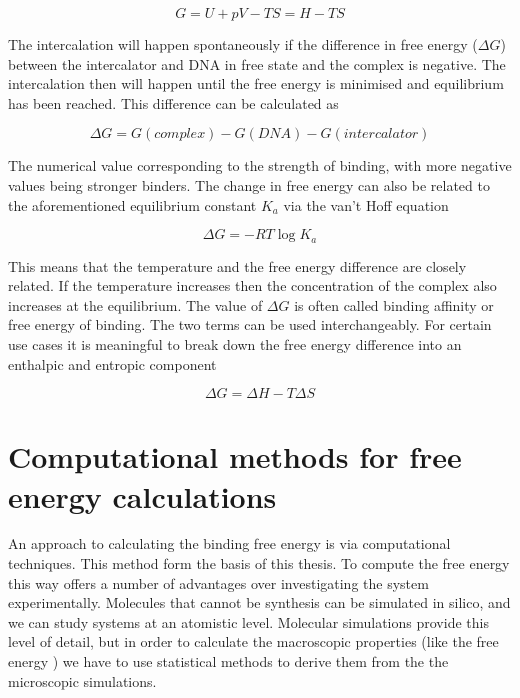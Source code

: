 \documentclass[11pt, a4paper]{report}
\begin{document}
\begin{equation}
  G = U + pV - TS = H - TS
\end{equation}

The intercalation will happen spontaneously if the difference in free energy ($\Delta G$) between the intercalator and DNA in free state and the complex is negative. The intercalation then will happen until the free energy is minimised and equilibrium has been reached. This difference can be calculated as

\begin{equation}
  \Delta G = G(complex) - G(DNA) - G(intercalator)
\end{equation} 

The numerical value corresponding to the strength of binding, with more negative values being stronger binders. The change in free energy can also be related to the aforementioned equilibrium constant $K_a$ via the van't Hoff equation

\begin{equation}
  \Delta G = - R T \log K_a
\end{equation}

This means that the temperature and the free energy difference are closely related. If the temperature increases then the concentration of the complex also increases at the equilibrium. The value of $\Delta G$ is often called binding affinity or free energy of binding. The two terms can be used interchangeably. For certain use cases it is meaningful to break down the free energy difference into an enthalpic and entropic component

\begin{equation}
  \Delta G = \Delta H - T \Delta S
\end{equation} 

\section{Computational methods for free energy calculations}

An approach to calculating the binding free energy is via computational techniques. This method form the basis of this thesis. To compute the free energy this way offers a number of advantages over investigating the system experimentally. Molecules that cannot be synthesis can be simulated in silico, and we can study systems at an atomistic level. Molecular simulations provide this level of detail, but in order to calculate the macroscopic properties (like the free energy \cite{macke1961ld}) we have to use statistical methods to derive them from the the microscopic simulations.
\end{document}
